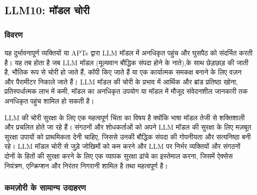\documentclass[
]{article}
\author{}
\date{}
\begin{document}
\subsection{LLM10: मॉडल चोरी}\label{llm10-ux92eux921ux932-ux91aux930}

\subsubsection{विवरण}\label{ux935ux935ux930ux923}

यह दुर्भावनापूर्ण व्यक्तियों या APTs द्वारा LLM मॉडल में अनधिकृत पहुंच और घुसपैठ को
संदर्भित करती है। यह तब होता है जब LLM मॉडल (मूल्यवान बौद्धिक संपदा होने के नाते),के
साथ छेड़छाड़ की जाती है, भौतिक रूप से चोरी हो जाते हैं, कॉपी किए जाते हैं या एक
कार्यात्मक समकक्ष बनाने के लिए वज़न और पैरामीटर निकाले जाते हैं। LLM मॉडल की चोरी के
प्रभाव में आर्थिक और ब्रांड प्रतिष्ठा खोना, प्रतिस्पर्धात्मक लाभ में कमी, मॉडल का
अनधिकृत उपयोग या मॉडल में मौजूद संवेदनशील जानकारी तक अनधिकृत पहुंच शामिल हो सकती
है।

LLM की चोरी सुरक्षा के लिए एक महत्वपूर्ण चिंता का विषय है क्योंकि भाषा मॉडल तेजी से
शक्तिशाली और प्रचलित होते जा रहे हैं। संगठनों और शोधकर्ताओं को अपने LLM मॉडल की
सुरक्षा के लिए मज़बूत सुरक्षा उपायों को प्राथमिकता देनी चाहिए, जिससे उनकी बौद्धिक
संपदा की गोपनीयता और सत्यनिष्ठा बनी रहे। LLM मॉडल चोरी से जुड़े जोखिमों को कम करने
और LLM पर निर्भर व्यक्तियों और संगठनों दोनों के हितों की सुरक्षा करने के लिए एक व्यापक
सुरक्षा ढांचे का इस्तेमाल करना, जिसमें ऐक्सेस नियंत्रण, एन्क्रिप्शन और निरंतर निगरानी
शामिल है तथा महत्वपूर्ण है।

\subsubsection{कमज़ोरी के सामान्य
उदाहरण}\label{ux915ux92eux95bux930-ux915-ux938ux92eux928ux92f-ux909ux926ux939ux930ux923}
\end{document}
